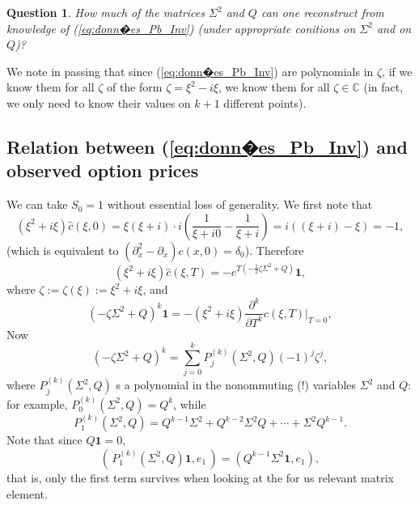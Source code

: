 \documentclass[a4paper, 11pt]{amsart}
\newtheorem{question}{Question}
\newtheorem{definition and theorem}[theorem]{Definition and   
Theorem}
\begin{document}
\begin{question} How much of the matrices $\Sigma ^2 $ and $Q $ can one reconstruct from knowledge of (\ref{eq:donn�es_Pb_Inv}) (under appropriate conitions on $\Sigma ^2 $ and on $Q $)?
\end{question}

We note in passing that since (\ref{eq:donn�es_Pb_Inv}) are polynomials in $\zeta $, if we know them for all $\zeta $ of the form $\zeta = \xi ^2 - i \xi $, we know them for all $\zeta \in \mathbb{C } $ (in fact, we only need to know their values on $k + 1 $ different points). %
\medskip

\subsection{Relation between (\ref{eq:donn�es_Pb_Inv}) and observed option prices} We can take $S_0 = 1 $ without essential loss of generality. We first note that
$$
    (\xi ^2 + i \xi ) \widehat{c } (\xi , 0 ) =   \xi (\xi + i ) \cdot i \left( \frac{1 }{\xi + i 0 } - \frac{1 }{\xi + i } \right) = i ( (\xi + i ) - \xi ) = -1 ,
$$
(which is equivalent to $(\partial _x ^2 - \partial _x ) c(x, 0 ) = \delta _0 $). Therefore
$$
    (\xi ^2 + i \xi ) \widehat{c } (\xi , T ) %
    = - e^{ T ( - \frac{1 }{2 } %
            \zeta \Sigma ^2 + Q ) } \mathbf{1 } ,
$$
where $\zeta := \zeta (\xi ) := \xi ^2 + i \xi $, and
$$
    ( - \zeta \Sigma ^2 + Q ) ^k \mathbf{1 } %
    = - (\xi ^2 + i \xi ) \frac{\partial ^k }{\partial T ^k } %
    \widehat{c } (\xi , T ) |_{T = 0 } ,
$$
Now
$$
    ( - \zeta \Sigma ^2 + Q )^k = \sum _{j = 0 } ^k P^{(k) } _j (\Sigma ^2 , Q ) (-1 )^j \zeta ^j ,
$$
where $P^{(k) } _j (\Sigma ^2 , Q ) $ s a polynomial in the nonommuting (!) variables $\Sigma ^2 $ and $Q $: for example, $P^{(k)} _0 (\Sigma ^2 , Q ) = Q^k $, while
$$
    P^{(k)}  _1 (\Sigma ^2 , Q ) = Q^{k - 1 } \Sigma ^2 + Q^{k - 2 } \Sigma ^2 Q + \cdots + \Sigma ^2 Q^{k - 1 } .
$$
Note that since $Q \mathbf{1 } = 0 $,
$$
    \left( \, P^{(k) }  _1 (\Sigma ^2 , Q ) \mathbf{1 } , e_1 \, \right) = (Q^{k - 1 } \Sigma ^2 \mathbf{1 } , e_1 ) ,
$$
that is, only the first term survives when looking at the for us relevant matrix element.
\end{document}

